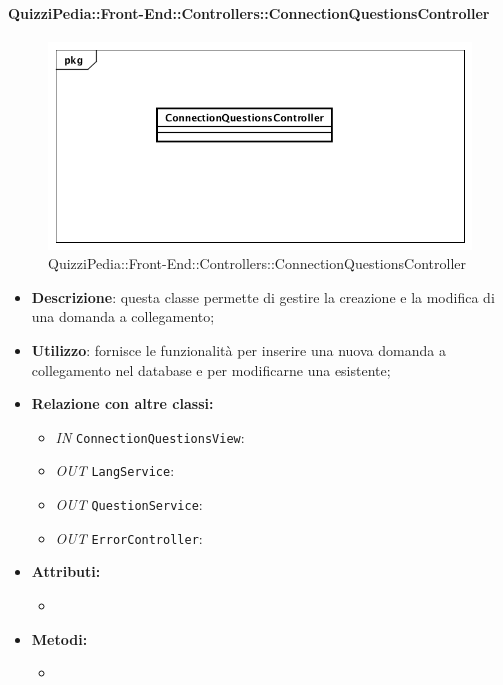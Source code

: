 \paragraph{QuizziPedia::Front-End::Controllers::ConnectionQuestionsController}
\begin{figure}
	\centering
	\includegraphics[scale=0.45]{UML/Classi/Front-End/QuizziPedia_Front-end_Controller_ConnectionQuestionsController.png}
	\caption{QuizziPedia::Front-End::Controllers::ConnectionQuestionsController}
\end{figure}
\begin{itemize}
	\item \textbf{Descrizione}: questa classe permette di gestire la creazione e la modifica di una domanda a collegamento;
	\item \textbf{Utilizzo}: fornisce le funzionalità per inserire una nuova domanda a collegamento nel database e per modificarne una esistente;
	\item \textbf{Relazione con altre classi:}
	\begin{itemize}
		\item \textit{IN} \texttt{ConnectionQuestionsView}:  
		\item \textit{OUT} \texttt{LangService}: 
		\item \textit{OUT} \texttt{QuestionService}:
		\item \textit{OUT} \texttt{ErrorController}: 
	\end{itemize}
	\item \textbf{Attributi:}
	\begin{itemize}
		\item 
	\end{itemize}
	\item \textbf{Metodi:}
	\begin{itemize}
		\item 
	\end{itemize}
\end{itemize}

